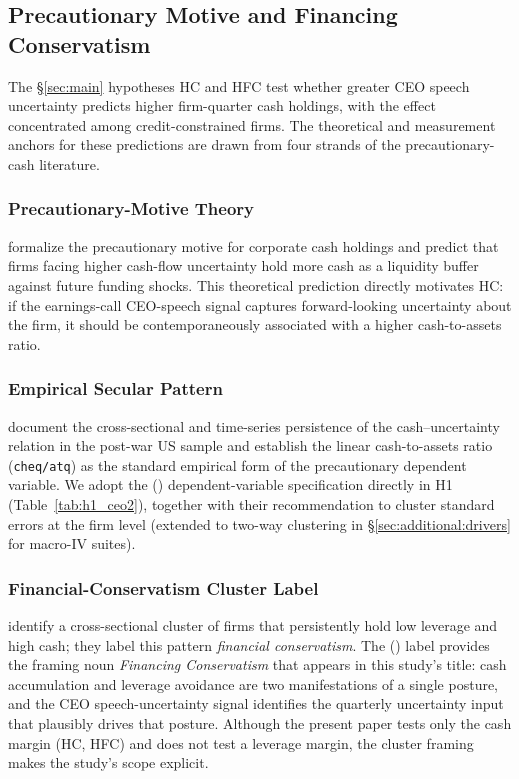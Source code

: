 \subsection{Precautionary Motive and Financing Conservatism}
\label{sec:framework:precautionary}

The \S\ref{sec:main} hypotheses HC and HFC test whether greater CEO speech uncertainty predicts higher firm-quarter cash holdings, with the effect concentrated among credit-constrained firms. The theoretical and measurement anchors for these predictions are drawn from four strands of the precautionary-cash literature.

\subsubsection{Precautionary-Motive Theory}

 formalize the precautionary motive for corporate cash holdings and predict that firms facing higher cash-flow uncertainty hold more cash as a liquidity buffer against future funding shocks. This theoretical prediction directly motivates HC: if the earnings-call CEO-speech signal captures forward-looking uncertainty about the firm, it should be contemporaneously associated with a higher cash-to-assets ratio.

\subsubsection{Empirical Secular Pattern}

 document the cross-sectional and time-series persistence of the cash--uncertainty relation in the post-war US sample and establish the linear cash-to-assets ratio (\texttt{cheq/atq}) as the standard empirical form of the precautionary dependent variable. We adopt the \citeauthor{bates2009} (\citeyear{bates2009}) dependent-variable specification directly in H1 (Table~\ref{tab:h1_ceo2}), together with their recommendation to cluster standard errors at the firm level (extended to two-way clustering in \S\ref{sec:additional:drivers} for macro-IV suites).

\subsubsection{Financial-Conservatism Cluster Label}

 identify a cross-sectional cluster of firms that persistently hold low leverage and high cash; they label this pattern \emph{financial conservatism}. The \citeauthor{minton2001} (\citeyear{minton2001}) label provides the framing noun \emph{Financing Conservatism} that appears in this study's title: cash accumulation and leverage avoidance are two manifestations of a single posture, and the CEO speech-uncertainty signal identifies the quarterly uncertainty input that plausibly drives that posture. Although the present paper tests only the cash margin (HC, HFC) and does not test a leverage margin, the \citeauthor{minton2001} cluster framing makes the study's scope explicit.

